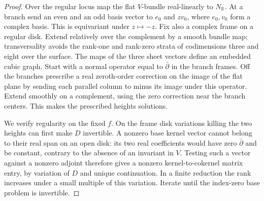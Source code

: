 \begin{proof}
Over the regular locus map the flat $V$-bundle real-linearly to
$N_{\mathbb R}$. At a branch send an even and an odd basis vector to
$e_0$ and $zv_0$, where $e_0,v_0$ form a complex basis.
This is equivariant under $z\mapsto-z$. Fix also a complex frame on
a regular disk. Extend relatively over the complement by a smooth
bundle map; transversality avoids the rank-one and rank-zero strata
of codimensions three and eight over the surface. The maps of the
three sheet vectors define an embedded cubic graph. Start with a
normal operator equal to $\bar\partial$ in the branch frames. Off
the branches prescribe a real zeroth-order correction on the image
of the flat plane by sending each parallel column to minus its
image under this operator. Extend smoothly on a complement, using
the zero correction near the branch centers. This makes the
prescribed heights solutions.

We verify regularity on the fixed $f$. On the frame disk variations
killing the two heights can first make $D$ invertible. A nonzero
base kernel vector cannot belong to their real span on an open
disk: its two real coefficients would have zero $\bar\partial$ and
be constant, contrary to the absence of an invariant in $V$.
Testing such a vector against a nonzero adjoint therefore gives
a nonzero kernel-to-cokernel matrix entry, by variation of $D$
and unique continuation. In a finite reduction the rank increases
under a small multiple of this variation. Iterate until the
index-zero base problem is invertible.


\end{proof}
